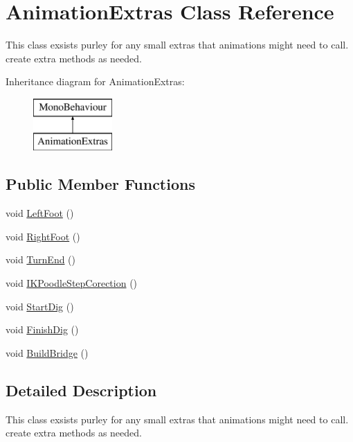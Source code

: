 \hypertarget{class_animation_extras}{}\section{Animation\+Extras Class Reference}
\label{class_animation_extras}


This class exsists purley for any small extras that animations might need to call. create extra methods as needed.  


Inheritance diagram for Animation\+Extras\+:\begin{figure}[H]
\begin{center}
\leavevmode
\includegraphics[height=2.000000cm]{class_animation_extras}
\end{center}
\end{figure}
\subsection*{Public Member Functions}
\begin{DoxyCompactItemize}
\item 
void \mbox{\hyperlink{class_animation_extras_a5c2b33e665c2ffcd4616fee7b4e74fcc}{Left\+Foot}} ()
\item 
void \mbox{\hyperlink{class_animation_extras_a698a00e06adf4adcb7ad80a47166c6f5}{Right\+Foot}} ()
\item 
void \mbox{\hyperlink{class_animation_extras_a36c35f06a9216bebdfe871206cb69778}{Turn\+End}} ()
\item 
void \mbox{\hyperlink{class_animation_extras_a9117c4bbf2a42e5b2996a081fcba07cc}{I\+K\+Poodle\+Step\+Corection}} ()
\item 
void \mbox{\hyperlink{class_animation_extras_a33e63f21f3d2269719479493e9b29001}{Start\+Dig}} ()
\item 
void \mbox{\hyperlink{class_animation_extras_a7feae62a6bb9889a3b439efd5ba38389}{Finish\+Dig}} ()
\item 
void \mbox{\hyperlink{class_animation_extras_a4065dec8cbea298f0fb3d77287ffc525}{Build\+Bridge}} ()
\end{DoxyCompactItemize}


\subsection{Detailed Description}
This class exsists purley for any small extras that animations might need to call. create extra methods as needed. 



